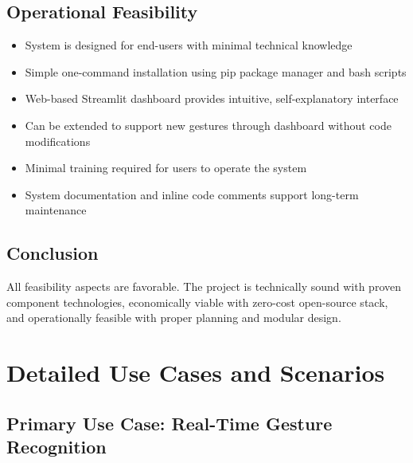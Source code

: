 \subsection{Operational Feasibility}

\begin{itemize}
    \item System is designed for end-users with minimal technical knowledge
    \item Simple one-command installation using pip package manager and bash scripts
    \item Web-based Streamlit dashboard provides intuitive, self-explanatory interface
    \item Can be extended to support new gestures through dashboard without code modifications
    \item Minimal training required for users to operate the system
    \item System documentation and inline code comments support long-term maintenance
\end{itemize}

\subsection{Conclusion}

All feasibility aspects are favorable. The project is technically sound with proven component technologies, economically viable with zero-cost open-source stack, and operationally feasible with proper planning and modular design.

\section{Detailed Use Cases and Scenarios}

\subsection{Primary Use Case: Real-Time Gesture Recognition}


